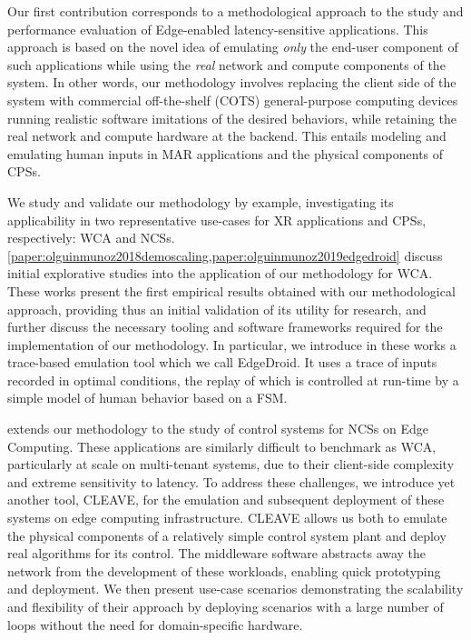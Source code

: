 \medskip

Our first contribution corresponds to a methodological approach to the study and performance evaluation of Edge-enabled latency-sensitive applications. 
This approach is based on the novel idea of emulating \emph{only} the end-user component of such applications while using the \emph{real} network and compute components of the system.
In other words, our methodology involves replacing the client side of the system with commercial off-the-shelf (COTS) general-purpose computing devices running realistic software imitations of the desired behaviors, while retaining the real network and compute hardware at the backend.
This entails modeling and emulating human inputs in \gls{MAR} applications and the physical components of \glspl{CPS}.

We study and validate our methodology by example, investigating its applicability in two representative use-cases for \gls{XR} applications and \glspl{CPS}, respectively: \acf{WCA} and \acfp{NCS}.
\cref{paper:olguinmunoz2018demoscaling,paper:olguinmunoz2019edgedroid} discuss initial explorative studies into the application of our methodology for \gls{WCA}.
These works present the first empirical results obtained with our methodological approach, providing thus an initial validation of its utility for research, and further discuss the necessary tooling and software frameworks required for the implementation of our methodology.
In particular, we introduce in these works a trace-based emulation tool which we call EdgeDroid.
It uses a trace of inputs recorded in optimal conditions, the replay of which is controlled at run-time by a simple model of human behavior based on a \gls{FSM}.

 extends our methodology to the study of control systems for \glspl{NCS} on Edge Computing.
These applications are similarly difficult to benchmark as \gls{WCA}, particularly at scale on multi-tenant systems, due to their client-side complexity and extreme sensitivity to latency.
To address these challenges, we introduce yet another tool, \gls{CLEAVE}, for the emulation and subsequent deployment of these systems on edge computing infrastructure.
\gls{CLEAVE} allows us both to emulate the physical components of a relatively simple control system plant and deploy real algorithms for its control.
The middleware software abstracts away the network from the development of these workloads, enabling quick prototyping and deployment.
We then present use-case scenarios demonstrating the scalability and flexibility of their approach by deploying scenarios with a large number of loops without the need for domain-specific hardware.

